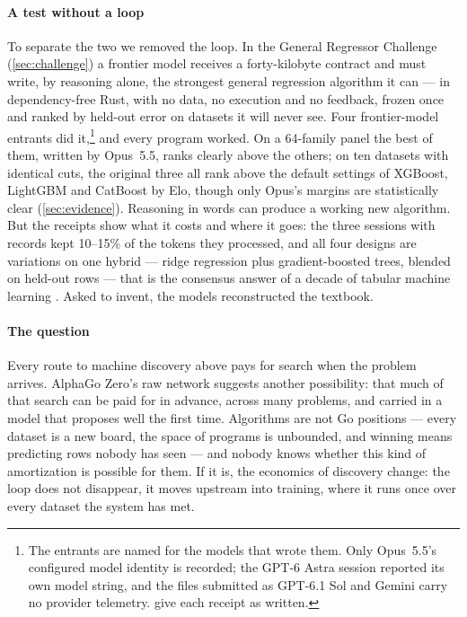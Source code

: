 \paragraph{A test without a loop} To separate the two we removed the loop. In the General Regressor
Challenge (\cref{sec:challenge}) a frontier model receives a forty-kilobyte contract and must write, by
reasoning alone, the strongest general regression algorithm it can --- in dependency-free Rust, with
no data, no execution and no feedback, frozen once and ranked by held-out error on datasets it will
never see. Four frontier-model entrants did it,\footnote{The entrants are named for the models that
wrote them. Only Opus~5.5's configured model identity is recorded; the GPT-6 Astra session reported
its own model string, and the files submitted as GPT-6.1 Sol and Gemini carry no provider
telemetry.  give each receipt as written.} and every program
worked. On a 64-family panel the best of them, written by Opus~5.5, ranks clearly above the
others; on ten datasets with identical cuts, the original three all rank above the default settings
of XGBoost, LightGBM and CatBoost by Elo, though only Opus's margins are statistically clear
(\cref{sec:evidence}). Reasoning in words can produce a working new algorithm. But the receipts show
what it costs and where it goes: the three sessions with records kept 10--15\% of the tokens they
processed, and all four designs are variations on one hybrid --- ridge regression plus
gradient-boosted trees, blended on held-out rows --- that is the consensus answer of a decade of
tabular machine learning \citep{grinsztajn2022trees}. Asked to invent, the models reconstructed the
textbook.

\paragraph{The question} Every route to machine discovery above pays for search when the problem
arrives. AlphaGo Zero's raw network suggests another possibility: that much of that search can be
paid for in advance, across many problems, and carried in a model that proposes well the first
time. Algorithms are not Go positions --- every dataset is a new board, the space of programs is
unbounded, and winning means predicting rows nobody has seen --- and nobody knows whether this kind
of amortization is possible for them. If it is, the economics of discovery change: the loop does
not disappear, it moves upstream into training, where it runs once over every dataset the system
has met.

